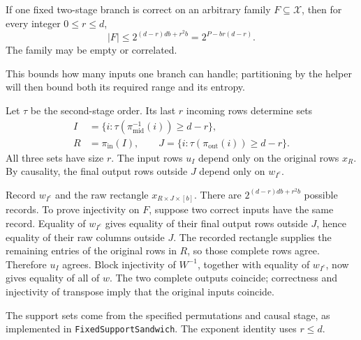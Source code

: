 \begin{lemma}\label{lem:local-branch-count}
If one fixed two-stage branch is correct on an arbitrary family
$F\subseteq\mathcal X$, then for every integer $0\le r\le d$,
\begin{equation}\label{eq:local-branch-count}
  |F|\le 2^{(d-r)db+r^2b}=2^{P-br(d-r)}.
\end{equation}
The family may be empty or correlated.
\end{lemma}
This bounds how many inputs one branch can handle; partitioning by the helper
will then bound both its required range and its entropy.
\begin{proofoutline}
Let $\tau$ be the second-stage order.  Its last $r$ incoming rows determine
sets
\begin{align*}
 I&=\{i:\tau(\pi_{\mathrm{mid}}^{-1}(i))\ge d-r\},\\
 R&=\pi_{\mathrm{in}}(I),\qquad
 J=\{i:\tau(\pi_{\mathrm{out}}(i))\ge d-r\}.
\end{align*}
All three sets have size $r$.  The input rows $u_I$ depend only on the original
rows $x_R$.  By causality, the final output rows outside $J$ depend only on
$w_{I^c}$.

Record $w_{I^c}$ and the raw rectangle $x_{R\times J\times[b]}$.  There are
$2^{(d-r)db+r^2b}$ possible records.  To prove injectivity on $F$, suppose two
correct inputs have the same record.  Equality of $w_{I^c}$ gives equality of
their final output rows outside $J$, hence equality of their raw columns
outside $J$.  The recorded rectangle supplies the remaining entries of the
original rows in $R$, so those complete rows agree.  Therefore $u_I$ agrees.
Block injectivity of $W^{-1}$, together with equality of $w_{I^c}$, now gives
equality of all of $w$.  The two complete outputs coincide; correctness and
injectivity of transpose imply that the original inputs coincide.

The support sets come from the specified permutations and causal stage, as
implemented in \texttt{FixedSupportSandwich}.  The exponent identity uses
$r\le d$.
\end{proofoutline}

